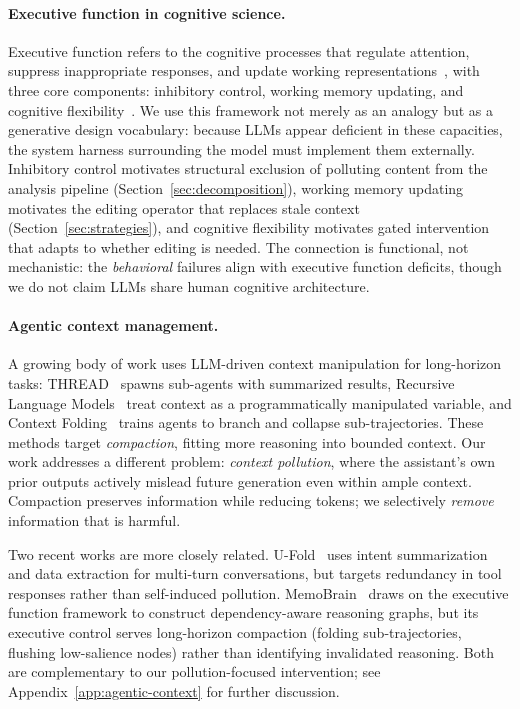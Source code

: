 \documentclass{article} %
\begin{document}
\paragraph{Executive function in cognitive science.}
Executive function refers to the cognitive processes that regulate attention, suppress inappropriate responses, and update working representations~\citep{miyake2000unity}, with three core components: inhibitory control, working memory updating, and cognitive flexibility~\citep{diamond2013executive}. We use this framework not merely as an analogy but as a generative design vocabulary: because LLMs appear deficient in these capacities, the system harness surrounding the model must implement them externally. Inhibitory control motivates structural exclusion of polluting content from the analysis pipeline (Section~\ref{sec:decomposition}), working memory updating motivates the editing operator that replaces stale context (Section~\ref{sec:strategies}), and cognitive flexibility motivates gated intervention that adapts to whether editing is needed. The connection is functional, not mechanistic: the \emph{behavioral} failures align with executive function deficits, though we do not claim LLMs share human cognitive architecture.

\paragraph{Agentic context management.}
A growing body of work uses LLM-driven context manipulation for long-horizon tasks: THREAD~\citep{schroeder2025thread} spawns sub-agents with summarized results, Recursive Language Models~\citep{zhang2025rlm} treat context as a programmatically manipulated variable, and Context Folding~\citep{sun2025contextfolding} trains agents to branch and collapse sub-trajectories. These methods target \emph{compaction}, fitting more reasoning into bounded context. Our work addresses a different problem: \emph{context pollution}, where the assistant's own prior outputs actively mislead future generation even within ample context. Compaction preserves information while reducing tokens; we selectively \emph{remove} information that is harmful.

Two recent works are more closely related. U-Fold~\citep{su2026ufold} uses intent summarization and data extraction for multi-turn conversations, but targets redundancy in tool responses rather than self-induced pollution. MemoBrain~\citep{qian2026memobrain} draws on the executive function framework to construct dependency-aware reasoning graphs, but its executive control serves long-horizon compaction (folding sub-trajectories, flushing low-salience nodes) rather than identifying invalidated reasoning. Both are complementary to our pollution-focused intervention; see Appendix~\ref{app:agentic-context} for further discussion.
\end{document}

